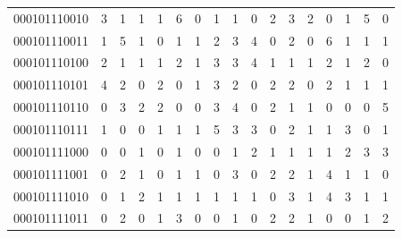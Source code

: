 \documentclass[10pt,a4paper]{article}
\begin{document}
\begin{longtable}{ |c|c|c|c|c|c|c|c|c|c|c|c|c|c|c|c|c| }
    000101110010              & 3                            & 1                                & 1                            & 1                              & 6   & 0   & 1   & 1   & 0   & 2   & 3   & 2   & 0   & 1   & 5   & 0   \\
    000101110011              & 1                            & 5                                & 1                            & 0                              & 1   & 1   & 2   & 3   & 4   & 0   & 2   & 0   & 6   & 1   & 1   & 1   \\
    000101110100              & 2                            & 1                                & 1                            & 1                              & 2   & 1   & 3   & 3   & 4   & 1   & 1   & 1   & 2   & 1   & 2   & 0   \\
    000101110101              & 4                            & 2                                & 0                            & 2                              & 0   & 1   & 3   & 2   & 0   & 2   & 2   & 0   & 2   & 1   & 1   & 1   \\
    000101110110              & 0                            & 3                                & 2                            & 2                              & 0   & 0   & 3   & 4   & 0   & 2   & 1   & 1   & 0   & 0   & 0   & 5   \\
    000101110111              & 1                            & 0                                & 0                            & 1                              & 1   & 1   & 5   & 3   & 3   & 0   & 2   & 1   & 1   & 3   & 0   & 1   \\
    000101111000              & 0                            & 0                                & 1                            & 0                              & 1   & 0   & 0   & 1   & 2   & 1   & 1   & 1   & 1   & 2   & 3   & 3   \\
    000101111001              & 0                            & 2                                & 1                            & 0                              & 1   & 1   & 0   & 3   & 0   & 2   & 2   & 1   & 4   & 1   & 1   & 0   \\
    000101111010              & 0                            & 1                                & 2                            & 1                              & 1   & 1   & 1   & 1   & 1   & 0   & 3   & 1   & 4   & 3   & 1   & 1   \\
    000101111011              & 0                            & 2                                & 0                            & 1                              & 3   & 0   & 0   & 1   & 0   & 2   & 2   & 1   & 0   & 0   & 1   & 2   \\

\end{longtable}
\end{document}
